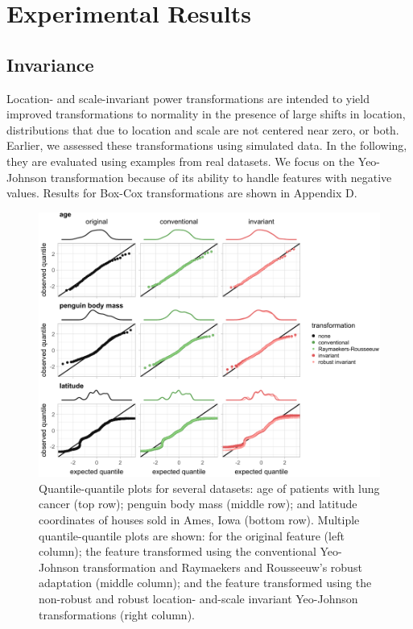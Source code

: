 \documentclass[
  a4paper,
]{article}
\begin{document}
\section{Experimental Results}\label{experimental-results}

\subsection{Invariance}\label{invariance}

Location- and scale-invariant power transformations are intended to
yield improved transformations to normality in the presence of large
shifts in location, distributions that due to location and scale are not
centered near zero, or both. Earlier, we assessed these transformations
using simulated data. In the following, they are evaluated using
examples from real datasets. We focus on the Yeo-Johnson transformation
because of its ability to handle features with negative values. Results
for Box-Cox transformations are shown in Appendix D.

\begin{figure}

{\centering \includegraphics{manuscript_files/figure-latex/experimental-results-invariance-1} 

}

\caption{Quantile-quantile plots for several datasets: age of patients with lung cancer (top row); penguin body mass (middle row); and latitude coordinates of houses sold in Ames, Iowa (bottom row). Multiple quantile-quantile plots are shown: for the original feature (left column); the feature transformed using the conventional Yeo-Johnson transformation and Raymaekers and Rousseeuw's robust adaptation (middle column); and the feature transformed using the non-robust and robust location- and-scale invariant Yeo-Johnson transformations (right column).}\label{fig:experimental-results-invariance}
\end{figure}
\end{document}
